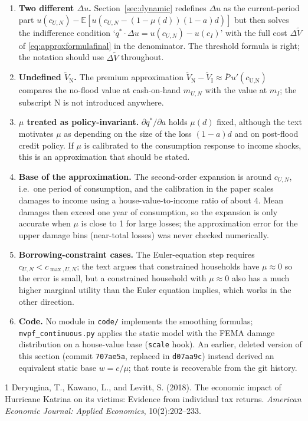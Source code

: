 \documentclass[12pt]{article}
\begin{document}
\begin{enumerate}
    \item \textbf{Two different $\Delta u$.} Section~\ref{sec:dynamic} redefines $\Delta u$ as the current-period part $u(c_{U,N})-\mathbb{E}[u(c_{U,N}-(1-\mu(d))(1-a)d)]$ but then solves the indifference condition `$q^*\cdot\Delta u = u(c_{U,N})-u(c_I)$' with the full cost $\Delta\tilde{V}$ of \eqref{eq:approxformulafinal} in the denominator. The threshold formula is right; the notation should use $\Delta\tilde{V}$ throughout.
    \item \textbf{Undefined $\tilde{V}_{\text{N}}$.} The premium approximation $\tilde{V}_{\text{N}}-\tilde{V}_{\text{I}}\approx\overline{P}\,u'(c_{\text{U,N}})$ compares the no-flood value at cash-on-hand $m_{U,N}$ with the value at $m_I$; the subscript N is not introduced anywhere.
    \item \textbf{$\mu$ treated as policy-invariant.} $\partial q^*/\partial a$ holds $\mu(d)$ fixed, although the text motivates $\mu$ as depending on the size of the loss $(1-a)d$ and on post-flood credit policy. If $\mu$ is calibrated to the consumption response to income shocks, this is an approximation that should be stated.
    \item \textbf{Base of the approximation.} The second-order expansion is around $c_{U,N}$, i.e.\ one period of consumption, and the calibration in the paper scales damages to income using a house-value-to-income ratio of about 4. Mean damages then exceed one year of consumption, so the expansion is only accurate when $\mu$ is close to 1 for large losses; the approximation error for the upper damage bins (near-total losses) was never checked numerically.
    \item \textbf{Borrowing-constraint cases.} The Euler-equation step requires $c_{U,N}<c_{\max,U,N}$; the text argues that constrained households have $\mu\approx0$ so the error is small, but a constrained household with $\mu\approx 0$ also has a much higher marginal utility than the Euler equation implies, which works in the other direction.
    \item \textbf{Code.} No module in \texttt{code/} implements the smoothing formulas; \texttt{mvpf\_continuous.py} applies the static model with the FEMA damage distribution on a house-value base (\texttt{scale} hook). An earlier, deleted version of this section (commit \texttt{707ae5a}, replaced in \texttt{d07aa9c}) instead derived an equivalent static base $w=c/\mu$; that route is recoverable from the git history.
\end{enumerate}

\begin{thebibliography}{1}
Deryugina, T., Kawano, L., and Levitt, S. (2018). The economic impact of Hurricane Katrina on its victims: Evidence from individual tax returns. \emph{American Economic Journal: Applied Economics}, 10(2):202--233.
\end{thebibliography}
\end{document}
